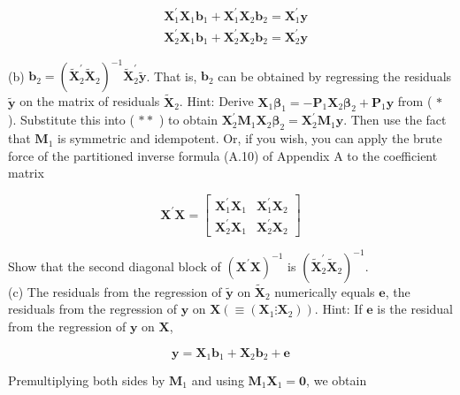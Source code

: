 \documentclass[10pt]{article}
\begin{document}
\begin{align*}
& \mathbf{X}_{1}^{\prime} \mathbf{X}_{1} \mathbf{b}_{1}+\mathbf{X}_{1}^{\prime} \mathbf{X}_{2} \mathbf{b}_{2}=\mathbf{X}_{1}^{\prime} \mathbf{y}  \tag{*}\\
& \mathbf{X}_{2}^{\prime} \mathbf{X}_{1} \mathbf{b}_{1}+\mathbf{X}_{2}^{\prime} \mathbf{X}_{2} \mathbf{b}_{2}=\mathbf{X}_{2}^{\prime} \mathbf{y} \tag{**}
\end{align*}


(b) $\mathbf{b}_{2}=\left(\widetilde{\mathbf{X}}_{2}^{\prime} \widetilde{\mathbf{X}}_{2}\right)^{-1} \widetilde{\mathbf{X}}_{2}^{\prime} \tilde{\mathbf{y}}$. That is, $\mathbf{b}_{2}$ can be obtained by regressing the residuals $\tilde{\mathbf{y}}$ on the matrix of residuals $\tilde{\mathbf{X}}_{2}$. Hint: Derive $\mathbf{X}_{1} \boldsymbol{\beta}_{1}=-\mathbf{P}_{1} \mathbf{X}_{2} \boldsymbol{\beta}_{2}+\mathbf{P}_{1} \mathbf{y}$ from ( $*$ ). Substitute this into ( $* *$ ) to obtain $\mathbf{X}_{2}^{\prime} \mathbf{M}_{1} \mathbf{X}_{2} \boldsymbol{\beta}_{2}=\mathbf{X}_{2}^{\prime} \mathbf{M}_{1} \mathbf{y}$. Then use the fact that $\mathbf{M}_{1}$ is symmetric and idempotent. Or, if you wish, you can apply the brute force of the partitioned inverse formula (A.10) of Appendix A to the coefficient matrix

$$
\mathbf{X}^{\prime} \mathbf{X}=\left[\begin{array}{ll}
\mathbf{X}_{1}^{\prime} \mathbf{X}_{1} & \mathbf{X}_{1}^{\prime} \mathbf{X}_{2} \\
\mathbf{X}_{2}^{\prime} \mathbf{X}_{1} & \mathbf{X}_{2}^{\prime} \mathbf{X}_{2}
\end{array}\right]
$$

Show that the second diagonal block of $\left(\mathbf{X}^{\prime} \mathbf{X}\right)^{-1}$ is $\left(\widetilde{\mathbf{X}}_{2}^{\prime} \widetilde{\mathbf{X}}_{2}\right)^{-1}$.\\
(c) The residuals from the regression of $\tilde{\mathbf{y}}$ on $\tilde{\mathbf{X}}_{2}$ numerically equals $\mathbf{e}$, the residuals from the regression of $\mathbf{y}$ on $\mathbf{X}\left(\equiv\left(\mathbf{X}_{1} \vdots \mathbf{X}_{2}\right)\right)$. Hint: If $\mathbf{e}$ is the residual from the regression of $\mathbf{y}$ on $\mathbf{X}$,

$$
\mathbf{y}=\mathbf{X}_{1} \mathbf{b}_{1}+\mathbf{X}_{2} \mathbf{b}_{2}+\mathbf{e}
$$

Premultiplying both sides by $\mathbf{M}_{1}$ and using $\mathbf{M}_{1} \mathbf{X}_{1}=\mathbf{0}$, we obtain
\end{document}
